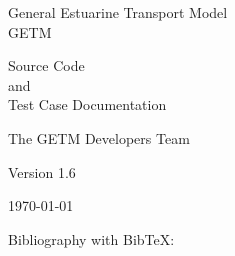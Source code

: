 \documentclass[a4paper,twoside]{article}
\begin{document}
\begin{titlepage}


\vspace{14mm}

{\sf \bf \huge
 \begin{center}
   General Estuarine Transport Model \\
   GETM
 \end{center}
}

\vspace{6mm}

{\sf \bf \LARGE
 \begin{center}
   Source Code \\
      and \\
Test Case Documentation
 \end{center}
}

{\sf \bf \LARGE
 \begin{center}
The GETM Developers Team   
 \end{center}
}


\vspace{5mm}

{\sf \bf \Large
 \begin{center}
  Version 1.6
 \end{center}
}

\vfill


{\sf \bf \Large
 \begin{center}
\today
 \end{center}
}

\vfill

\end{titlepage}


\cleardoublepage
\tableofcontents


\cleardoublepage



\cleardoublepage


%
%

%
%

\cleardoublepage



\cleardoublepage



%
%

%
%

%
%

%
%

%
%

%

 Bibliography with BibTeX:
\cleardoublepage


\end{document}
